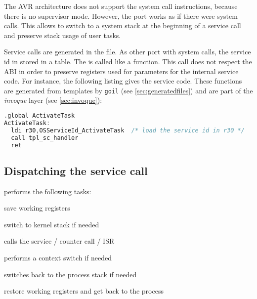 The AVR architecture does not support the system call instructions, because there is no supervisor mode. However, the port works as if there were system calls. This allows to switch to a system stack at the beginning of a service call and preserve stack usage of user tasks. 

Service calls are generated in the  file. As other port with system calls, the service id in stored in a table. The  is called like a function. This call does not respect the ABI in order to preserve registers used for parameters for the internal service code. For instance, the following listing gives the  service code. These functions are generated from templates by \texttt{goil} (see \ref{sec:generatedfiles}) and are part of the {\em invoque} layer (see \ref{sec:invoque}):

\begin{lstlisting}[language=C]
  .global ActivateTask
ActivateTask:
  ldi r30,OSServiceId_ActivateTask  /* load the service id in r30 */
  call tpl_sc_handler
  ret
\end{lstlisting}

%

\subsection{Dispatching the service call}

 performs the following tasks:
\begin{penum}
\item save working registers
\item switch to kernel stack if needed
\item calls the service / counter call / ISR
\item performs a context switch if needed
\item switches back to the process stack if needed
\item restore working registers and get back to the process
\end{penum}

